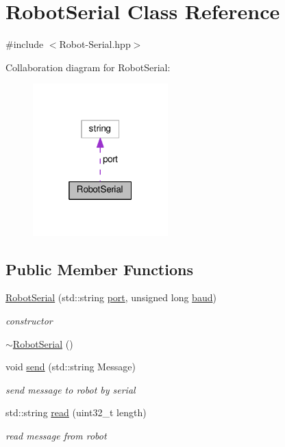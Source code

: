 \hypertarget{class_robot_serial}{}\section{Robot\+Serial Class Reference}
\label{class_robot_serial}


{\ttfamily \#include $<$Robot-\/\+Serial.\+hpp$>$}



Collaboration diagram for Robot\+Serial\+:\nopagebreak
\begin{figure}[H]
\begin{center}
\leavevmode
\includegraphics[width=148pt]{class_robot_serial__coll__graph}
\end{center}
\end{figure}
\subsection*{Public Member Functions}
\begin{DoxyCompactItemize}
\item 
\hyperlink{class_robot_serial_a3304340db412d4a8e79258c39f908812}{Robot\+Serial} (std\+::string \hyperlink{class_robot_serial_a6e9f213298488ef6699c3797f7d39a9d}{port}, unsigned long \hyperlink{class_robot_serial_a43213d6b68c48365cbe869097fd84a84}{baud})
\begin{DoxyCompactList}\small\item\em constructor \end{DoxyCompactList}\item 
\hyperlink{class_robot_serial_a1a28818f2b86670f0d8591c5d2e80353}{$\sim$\+Robot\+Serial} ()
\item 
void \hyperlink{class_robot_serial_a48929a3b47818cf3366b003b121ed539}{send} (std\+::string Message)
\begin{DoxyCompactList}\small\item\em send message to robot by serial \end{DoxyCompactList}\item 
std\+::string \hyperlink{class_robot_serial_a2bfa4d4a724c81c8f8b06d47a3c747fb}{read} (uint32\+\_\+t length)
\begin{DoxyCompactList}\small\item\em read message from robot \end{DoxyCompactList}\end{DoxyCompactItemize}
